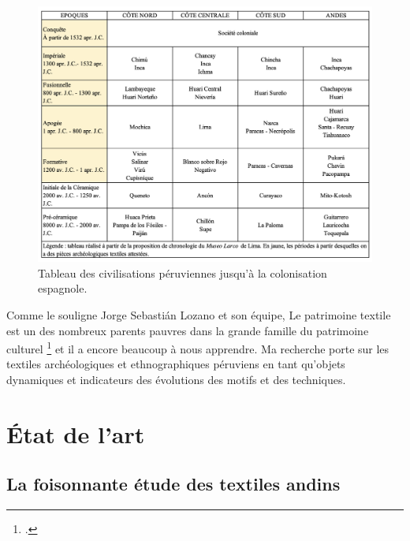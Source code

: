 \documentclass[a4paper, twoside, 12pt]{book}
\begin{document}
\begin{figure}[!h]
    \centering
    \includegraphics[width=12cm]{images/civiPerou.png}
    \caption{Tableau des civilisations péruviennes jusqu'à la colonisation espagnole.}
    \label{fig:1}
\end{figure}

Comme le souligne Jorge Sebastián Lozano et son équipe, \og Le patrimoine textile est un des nombreux parents pauvres dans la grande famille du patrimoine culturel \fg \footcite[p.~76]{sebastianlozanoCatalogosMuseoGran2020} et il a encore beaucoup à nous apprendre. Ma recherche porte sur les textiles archéologiques et ethnographiques péruviens en tant qu'objets dynamiques et indicateurs des évolutions des motifs et des techniques. 


\section*{État de l'art}

\subsection*{La foisonnante étude des textiles andins}
\end{document}
